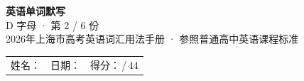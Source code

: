 \documentclass[10pt,a4paper]{article}
\begin{document}
\pagestyle{plain}

\begin{center}
{\LARGE\bfseries 英语单词默写}\\[0.22em]
{\large D 字母 · 第 2 / 6 份}\\[0.18em]
{\small 2026年上海市高考英语词汇用法手册 · 参照普通高中英语课程标准}
\end{center}

\vspace{0.25em}
\noindent\begin{tabular}{@{}p{}@{}p{}@{}p{}@{}}
姓名：\underline{\hspace{2.0cm}} & 日期：\underline{\hspace{2.0cm}} & 得分：\underline{\hspace{1.3cm}}\,/\,44 \\
\end{tabular}

\vspace{0.3em}

\vspace{0.08em}
\end{document}
